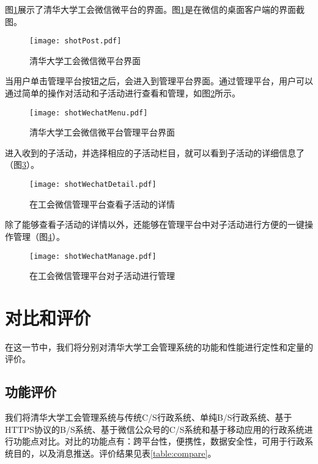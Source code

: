 图\ref{fig:shotPost}展示了清华大学工会微信微平台的界面。图\ref{fig:shotPost}是在微信的桌面客户端的界面截图。

\begin{figure}[H]
  \centering
  \texttt{[image: shotPost.pdf]}
  \caption{清华大学工会微信微平台界面}
  \label{fig:shotPost}
\end{figure}

当用户单击管理平台按钮之后，会进入到管理平台界面。通过管理平台，用户可以通过简单的操作对活动和子活动进行查看和管理，如图\ref{fig:shotWechatMenu}所示。

\begin{figure}[H]
  \centering
  \texttt{[image: shotWechatMenu.pdf]}
  \caption{清华大学工会微信微平台管理平台界面}
  \label{fig:shotWechatMenu}
\end{figure}

进入收到的子活动，并选择相应的子活动栏目，就可以看到子活动的详细信息了（图\ref{fig:shotWechatDetail}）。

\begin{figure}[H]
  \centering
  \texttt{[image: shotWechatDetail.pdf]}
  \caption{在工会微信管理平台查看子活动的详情}
  \label{fig:shotWechatDetail}
\end{figure}

除了能够查看子活动的详情以外，还能够在管理平台中对子活动进行方便的一键操作管理（图\ref{fig:shotWechatManage}）。

\begin{figure}[H]
  \centering
  \texttt{[image: shotWechatManage.pdf]}
  \caption{在工会微信管理平台对子活动进行管理}
  \label{fig:shotWechatManage}
\end{figure}

\section{对比和评价}

在这一节中，我们将分别对清华大学工会管理系统的功能和性能进行定性和定量的评价。

\subsection{功能评价}

我们将清华大学工会管理系统与传统C/S行政系统、单纯B/S行政系统、基于HTTPS协议的B/S系统、基于微信公众号的C/S系统和基于移动应用的行政系统进行功能点对比。对比的功能点有：跨平台性，便携性，数据安全性，可用于行政系统目的，以及消息推送。评价结果见表\ref{table:compare}。



